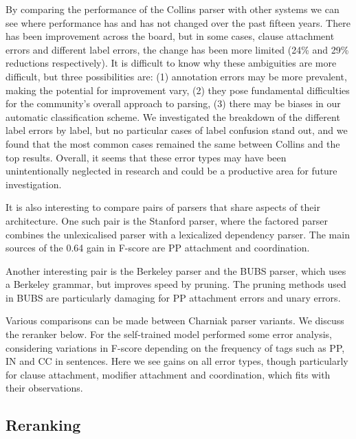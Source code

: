 By comparing the performance of the Collins parser with other systems we can see where performance has and has not changed over the past fifteen years.
There has been improvement across the board, but in some cases, \myeg clause attachment errors and different label errors, the change has been more limited (24\% and 29\% reductions respectively).
It is difficult to know why these ambiguities are more difficult, but three possibilities are:
(1) annotation errors may be more prevalent, making the potential for improvement vary,
(2) they pose fundamental difficulties for the community's overall approach to parsing,
(3) there may be biases in our automatic classification scheme.
We investigated the breakdown of the different label errors by label, but no particular cases of label confusion stand out, and we found that the most common cases remained the same between Collins and the top results.
Overall, it seems that these error types may have been unintentionally neglected in research and could be a productive area for future investigation.

It is also interesting to compare pairs of parsers that share aspects of their
architecture.  One such pair is the Stanford parser, where the factored parser
combines the unlexicalised parser with a lexicalized dependency parser.  The
main sources of the 0.64 gain in F-score are PP attachment and coordination.

Another interesting pair is the Berkeley parser and the BUBS parser, which uses
a Berkeley grammar, but improves speed by pruning.  The pruning methods used in
BUBS are particularly damaging for PP attachment errors and unary errors.

Various comparisons can be made between Charniak parser variants.  We discuss
the reranker below.  For the self-trained model
\textcite{McClosky-Charniak-Johnson:2006} performed some error analysis,
considering variations in F-score depending on the frequency of tags such as
PP, IN and CC in sentences.  Here we see gains on all error types, though
particularly for clause attachment, modifier attachment and coordination, which
fits with their observations.

\subsection{Reranking}

